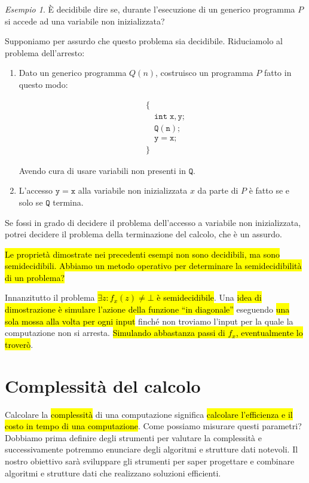 \documentclass[a4paper,11pt,oneside]{article}
\theoremstyle{plain}
\theoremstyle{definition}
\theoremstyle{remark}
\newtheorem{esempio}{Esempio}[section]
\begin{document}
\begin{esempio}
  È decidibile dire se, durante l'esecuzione di un generico programma $P$ si
  accede ad una variabile non inizializzata?

  Supponiamo per assurdo che questo problema sia decidibile. Riduciamolo al
  problema dell'arresto:

  \begin{enumerate}
    \item Dato un generico programma $Q(n)$, costruisco un programma $P$ fatto
      in questo modo:

      \begin{align*}
        & \{ \\
        & \quad \mathtt{int \; x,y;} \\
        & \quad \mathtt{Q(n);} \\
        & \quad \mathtt{y=x;} \\
        & \}
      \end{align*}

      Avendo cura di usare variabili non presenti in $\mathtt{Q}$.
    \item L'accesso $\mathtt{y=x}$ alla variabile non inizializzata $x$ da parte
      di $P$ è fatto se e solo se $\mathtt{Q}$ termina.
  \end{enumerate}

  Se fossi in grado di decidere il problema dell'accesso a variabile non
  inizializzata, potrei decidere il problema della terminazione del calcolo, che
  è un assurdo.
\end{esempio}

\hl{Le proprietà dimostrate nei precedenti esempi non sono decidibili, ma sono
semidecidibili. Abbiamo un metodo operativo per determinare la semidecidibilità
di un problema?}

Innanzitutto il problema \hl{$\exists z : f_x(z) \neq \bot$ è semidecidibile}.
Una \hl{idea di dimostrazione è simulare l'azione della funzione ``in
diagonale''} eseguendo \hl{una sola mossa alla volta per ogni input} finché non
troviamo l'input per la quale la computazione non si arresta. \hl{Simulando
abbastanza passi di $f_x$, eventualmente lo troverò}.

\section{Complessità del calcolo}\label{sec:complessita}

Calcolare la \hl{complessità} di una computazione significa \hl{calcolare
l'efficienza e il costo in tempo di una computazione}. Come possiamo misurare
questi parametri?  Dobbiamo prima definire degli strumenti per valutare la
complessità e successivamente potremmo enunciare degli algoritmi e strutture
dati notevoli. Il nostro obiettivo sarà sviluppare gli strumenti per saper
progettare e combinare algoritmi e strutture dati che realizzano soluzioni
efficienti.
\end{document}
